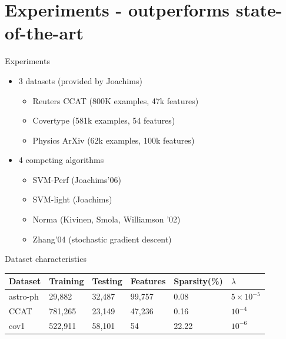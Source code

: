 \section{Experiments - outperforms state-of-the-art}
\begin{frame}{Experiments}
    \begin{itemize}
        \item 3 datasets (provided by Joachims) 
            \begin{itemize}
                \item Reuters CCAT (800K examples, 47k features)
                \item Covertype (581k examples, 54 features)
                \item Physics ArXiv (62k examples, 100k features)
            \end{itemize}
        \item 4 competing algorithms
            \begin{itemize}
                \item SVM-Perf (Joachims'06)
                \item SVM-light (Joachims)
                \item Norma (Kivinen, Smola, Williamson '02)
                \item Zhang'04 (stochastic gradient descent)
            \end{itemize}
    \end{itemize}
\end{frame}

\begin{frame}{Dataset characteristics}
\begin{table}[ht]
    \centering
    \begin{tabular}{l|l|l|l|l|l}
            \hline
            Dataset & Training & Testing & Features & Sparsity(\%) & $\lambda$ \\ \hline 
            astro-ph & 29,882 & 32,487 & 99,757 & 0.08 & $5\times 10^{-5}$ \\ 
            CCAT & 781,265 & 23,149 & 47,236 & 0.16 & $10^{-4}$ \\ 
            cov1 & 522,911 & 58,101 & 54 & 22.22 & $10^{-6}$ \\ \hline
        \end{tabular}
    \end{table}
\end{frame}

